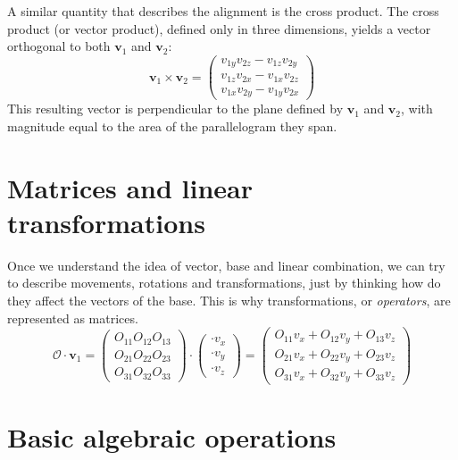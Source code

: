 \documentclass{book}
\begin{document}
A similar quantity that describes the alignment is the cross product. The cross product (or vector product), defined only in three dimensions, yields a vector orthogonal to both \( \mathbf{v}_1 \) and \( \mathbf{v}_2 \):
\begin{equation}
	\mathbf{v}_1 \times \mathbf{v}_2 =
	\begin{pmatrix}
		v_{1y}v_{2z} - v_{1z}v_{2y} \\
		v_{1z}v_{2x} - v_{1x}v_{2z} \\
		v_{1x}v_{2y} - v_{1y}v_{2x}
	\end{pmatrix}
\end{equation}
This resulting vector is perpendicular to the plane defined by \( \mathbf{v}_1 \) and \( \mathbf{v}_2 \), with magnitude equal to the area of the parallelogram they span.

\section{Matrices and linear transformations}

Once we understand the idea of vector, base and linear combination, we can try to describe movements, rotations and transformations, just by thinking how do they affect the vectors of the base. This is why transformations, or \textit{operators}, are represented as matrices.
\begin{equation}
	\mathcal{O} \cdot \mathbf{v}_1 =
	\begin{pmatrix}
		O_{11} O_{12} O_{13} \\
		O_{21} O_{22} O_{23} \\
		O_{31} O_{32} O_{33}
	\end{pmatrix} \cdot \begin{pmatrix} \cdot v_{x} \\ \cdot v_{y} \\ \cdot v_{z} \end{pmatrix} =
	\begin{pmatrix}
		O_{11} v_{x} + O_{12} v_{y} + O_{13} v_{z} \\
		O_{21} v_{x} + O_{22} v_{y} + O_{23} v_{z} \\
		O_{31} v_{x} + O_{32} v_{y} + O_{33} v_{z}
	\end{pmatrix}
\end{equation}

\section{Basic algebraic operations}
\end{document}
